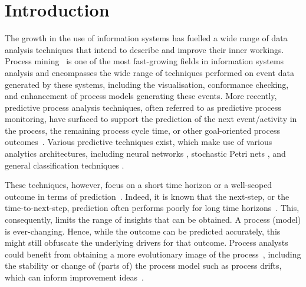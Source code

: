 \section{Introduction}\label{sec:introduction}

The growth in the use of information systems has fuelled a wide range of data analysis techniques that intend to describe and improve their inner workings.
Process mining~\cite{van2016data} is one of the most fast-growing fields in information systems analysis and encompasses the wide range of techniques performed on event data generated by these systems, including the visualisation, conformance checking, and enhancement of process models generating these events.
More recently, predictive process analysis techniques, often referred to as predictive process monitoring, have surfaced to support the prediction of the next event/activity in the process, the remaining process cycle time, or other goal-oriented process outcomes~\cite{DBLP:conf/bpm/Francescomarino18}.
Various predictive techniques exist, which make use of various analytics architectures, including neural networks \cite{DBLP:conf/caise/TaxVRD17}, stochastic Petri nets \cite{DBLP:conf/icsoc/Rogge-SoltiW13}, and general classification techniques \cite{DBLP:journals/tkdd/TeinemaaDRM19}.

These techniques, however, focus on a short time horizon or a well-scoped outcome in terms of prediction~\cite{DBLP:journals/tkdd/TeinemaaDRM19}.
Indeed, it is known that the next-step, or the time-to-next-step, prediction often performs poorly for long time horizons~\cite{park2020predicting}.
This, consequently, limits the range of insights that can be obtained. 
A process (model) is ever-changing. Hence, while the outcome can be predicted accurately, this might still obfuscate the underlying drivers for that outcome.
Process analysts could benefit from obtaining a more evolutionary image of the process~\cite{DBLP:conf/bpm/PollPRRR18}, including the stability or change of (parts of) the process model such as process drifts, which can inform improvement ideas~\cite{van2015pm}. 


